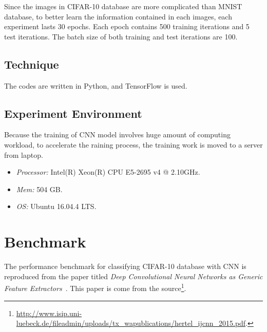 \documentclass[]{UCD_CS_FYP_Report}
\begin{document}
Since the images in CIFAR-10 database are more complicated than MNIST database, to better learn the information contained in each images, each experiment lasts 30 epochs. Each epoch contains 500 training iterations and 5 test iterations. The batch size of both training and test iterations are 100.
\subsection{Technique}
The codes are written in Python, and TensorFlow is used.
\subsection{Experiment Environment}
Because the training of CNN model involves huge amount of computing workload, to accelerate the raining process, the training work is moved  to a server from laptop.
\begin{itemize}
\item {\sl Processor:} Intel(R) Xeon(R) CPU E5-2695 v4 @ 2.10GHz.
\item {\sl Mem:} 504 GB.
\item {\sl OS:} Ubuntu 16.04.4 LTS.
\end{itemize}
\section{Benchmark}
The performance benchmark for classifying CIFAR-10 database with CNN is reproduced from the paper titled \emph{Deep Convolutional Neural Networks as Generic Feature Extractors}~\cite{Lars:2015}. This paper is come from the source\footnote{\url{http://www.isip.uni-luebeck.de/fileadmin/uploads/tx_wapublications/hertel_ijcnn_2015.pdf}.}.
\end{document}
